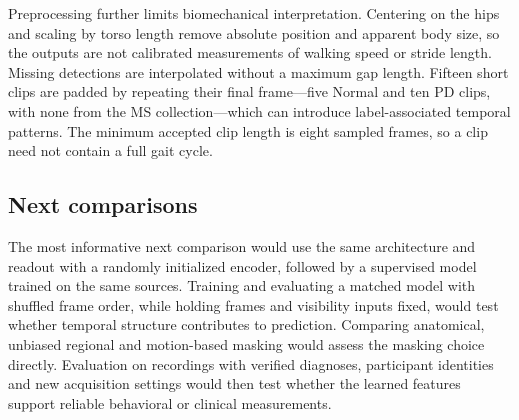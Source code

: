 Preprocessing further limits biomechanical interpretation. Centering on the hips and scaling by torso length remove absolute position and apparent body size, so the outputs are not calibrated measurements of walking speed or stride length. Missing detections are interpolated without a maximum gap length. Fifteen short clips are padded by repeating their final frame---five Normal and ten PD clips, with none from the MS collection---which can introduce label-associated temporal patterns. The minimum accepted clip length is eight sampled frames, so a clip need not contain a full gait cycle.

\subsection{Next comparisons}
The most informative next comparison would use the same architecture and readout with a randomly initialized encoder, followed by a supervised model trained on the same sources. Training and evaluating a matched model with shuffled frame order, while holding frames and visibility inputs fixed, would test whether temporal structure contributes to prediction. Comparing anatomical, unbiased regional and motion-based masking would assess the masking choice directly. Evaluation on recordings with verified diagnoses, participant identities and new acquisition settings would then test whether the learned features support reliable behavioral or clinical measurements.
